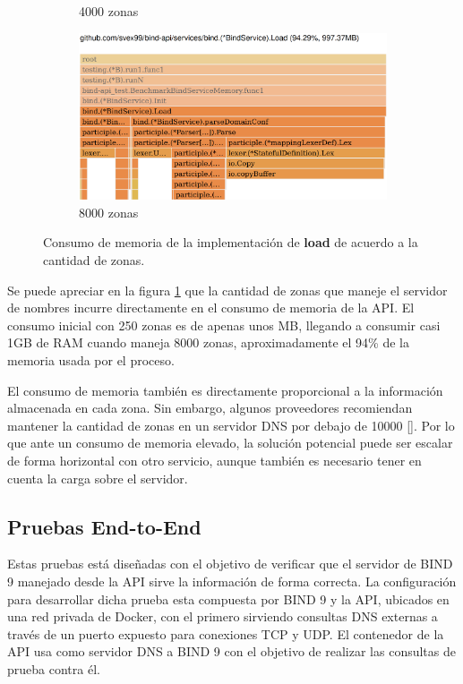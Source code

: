 \begin{figure}
\begin{subfigure}{0.49\textwidth}
        \caption{4000 zonas}
    \end{subfigure}
    \hfill
    \begin{subfigure}{0.49\textwidth}
        \includegraphics[width=\textwidth]{Graphics/mem8000z.png}
        \caption{8000 zonas}
    \end{subfigure}

    \caption{Consumo de memoria de la implementación de \textbf{load} de acuerdo a la cantidad de zonas.}
    \label{fig:bench-mem}
\end{figure}

Se puede apreciar en la figura \ref{fig:bench-mem} que la cantidad de zonas que maneje el servidor de nombres incurre directamente en el consumo de memoria de la API. El consumo inicial con 250 zonas es de apenas unos MB, llegando a consumir casi 1GB de RAM cuando maneja 8000 zonas, aproximadamente el 94\% de la memoria usada por el proceso.

El consumo de memoria también es directamente proporcional a la información almacenada en cada zona. Sin embargo, algunos proveedores recomiendan mantener la cantidad de zonas en un servidor DNS por debajo de 10000 [\cite{dns-cap}]. Por lo que ante un consumo de memoria elevado, la solución potencial puede ser escalar de forma horizontal con otro servicio, aunque también es necesario tener en cuenta la carga sobre el servidor.

\subsection{Pruebas End-to-End}

Estas pruebas está diseñadas con el objetivo de verificar que el servidor de BIND 9 manejado desde la API sirve la información de forma correcta. La configuración para desarrollar dicha prueba esta compuesta por BIND 9 y la API, ubicados en una red privada de Docker, con el primero sirviendo consultas DNS externas a través de un puerto expuesto para conexiones TCP y UDP. El contenedor de la API usa como servidor DNS a BIND 9 con el objetivo de realizar las consultas de prueba contra él.

